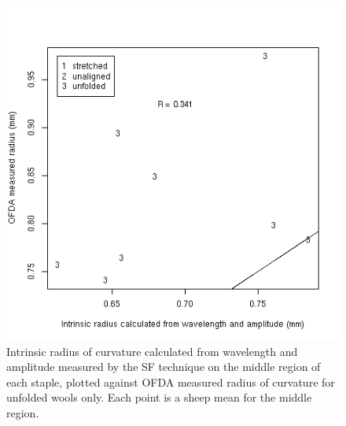 %

\begin{figure}[!h]
  \centering
  \includegraphics[width=1.0\textwidth]{figwaradthetaunfoldsfmid.png}
  \caption{Intrinsic radius of curvature calculated from wavelength and amplitude measured by the SF technique on the middle region of each staple, plotted against OFDA measured radius of curvature for unfolded wools only. Each point is a sheep mean for the middle region.}
  \label{fig:waradthetaunfoldsfmid}
\end{figure}

%

